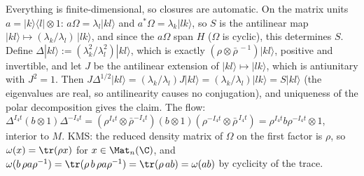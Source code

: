 Everything is finite-dimensional, so closures are automatic. On the matrix units $a = |k\rangle\langle l| \otimes 1$: $a\Omega = \lambda_l |kl\rangle$ and $a^*\Omega = \lambda_k |lk\rangle$, so $S$ is the antilinear map $|kl\rangle \mapsto (\lambda_k/\lambda_l)\,|lk\rangle$, and since the $a\Omega$ span $H$ ($\Omega$ is cyclic), this determines $S$. Define $\Delta |kl\rangle := (\lambda_k^2/\lambda_l^2)|kl\rangle$, which is exactly $(\rho \otimes \bar\rho^{\,-1})|kl\rangle$, positive and invertible, and let $J$ be the antilinear extension of $|kl\rangle \mapsto |lk\rangle$, which is antiunitary with $J^2 = 1$. Then $J\Delta^{1/2}|kl\rangle = (\lambda_k/\lambda_l) J|kl\rangle = (\lambda_k/\lambda_l)|lk\rangle = S|kl\rangle$ (the eigenvalues are real, so antilinearity causes no conjugation), and uniqueness of the polar decomposition gives the claim. The flow: $\Delta^{I_4t}(b \otimes 1)\Delta^{-I_4t} = (\rho^{I_4t}\otimes\bar\rho^{-I_4t})(b \otimes 1)(\rho^{-I_4t}\otimes\bar\rho^{\,I_4t}) = \rho^{I_4t} b \rho^{-I_4t} \otimes 1$, interior to $M$. KMS: the reduced density matrix of $\Omega$ on the first factor is $\rho$, so $\omega(x) = \tr(\rho x)$ for $x \in \Mat_n(\C)$, and $\omega(b\,\rho a \rho^{-1}) = \tr(\rho\, b\, \rho a \rho^{-1}) = \tr(\rho\, a b) = \omega(ab)$ by cyclicity of the trace.
